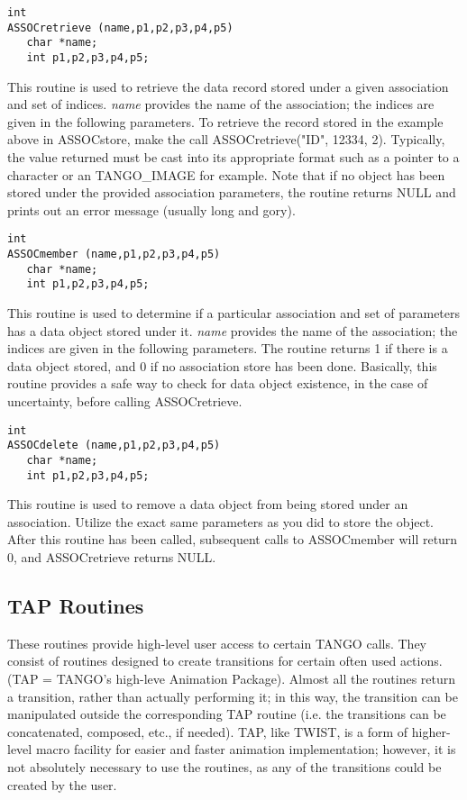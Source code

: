 \vspace{1em}
\begin{verbatim}
int
ASSOCretrieve (name,p1,p2,p3,p4,p5) 
   char *name;
   int p1,p2,p3,p4,p5;
\end{verbatim}
This routine is used to retrieve the data record stored under a given
association and set of indices.  {\em name} provides the name of the
association; the indices are given in the following parameters.  To retrieve
the record stored in the example above in ASSOCstore, make the call
ASSOCretrieve("ID", 12334, 2). Typically, the value returned must be cast into
its appropriate format such as a pointer to a character or an TANGO\_IMAGE for
example.  Note that if no object has been stored under the provided association
parameters, the routine returns NULL and prints out an error message
(usually long and gory).

\vspace{1em}
\begin{verbatim}
int
ASSOCmember (name,p1,p2,p3,p4,p5) 
   char *name;
   int p1,p2,p3,p4,p5;
\end{verbatim}
This routine is used to determine if a particular association and set
of parameters has a data object stored under it.  {\em name} provides the
name of the association; the indices are given in the following parameters.  
The routine returns 1 if there is a data object stored, and 0 if no
association store has been done.  Basically, this routine provides a
safe way to check for data object existence, in the case of uncertainty,
before calling ASSOCretrieve.

\vspace{1em}
\begin{verbatim}
int
ASSOCdelete (name,p1,p2,p3,p4,p5) 
   char *name;
   int p1,p2,p3,p4,p5;
\end{verbatim}
This routine is used to remove a data object from being stored under
an association.  Utilize the exact same parameters as you did to store
the object.  After this routine has been called, subsequent calls to
ASSOCmember will return 0, and ASSOCretrieve returns NULL.

\subsection{TAP Routines}
These routines provide high-level user access to certain TANGO calls.
They consist of routines designed to create transitions for certain
often used actions.  (TAP = TANGO's high-leve Animation Package).
Almost all the routines return a transition, rather than actually performing
it; in this way, the transition can be manipulated outside the corresponding
TAP routine (i.e. the transitions can be concatenated, composed, etc., if
needed).  TAP, like TWIST, is a form of higher-level macro facility for easier
and faster animation implementation; however, it is not absolutely
necessary to use the routines, as any of the transitions could be created
by the user.

